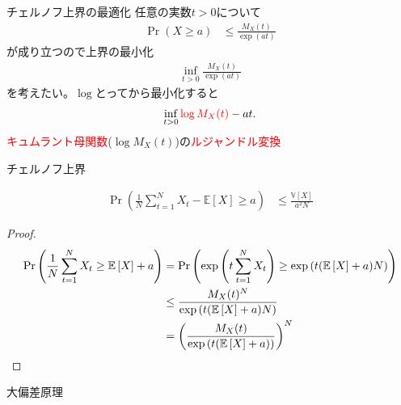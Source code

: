 \documentclass[lualatex,handout]{beamer}
\newcommand{\emm}[1]{\textcolor{red}{#1}}
\newcommand{\expt}[1]{\mathbb{E}\left[#1\right]}
\newcommand{\var}[1]{\mathbb{V}\left[#1\right]}
\theoremstyle{definition}
\begin{document}
\begin{frame}{チェルノフ上界の最適化}
任意の実数$t>0$について
\begin{align*}
\Pr(X\ge a)&\le\frac{M_X(t)}{\exp(at)}
\end{align*}
が成り立つので上界の最小化
\begin{align*}
\inf_{t>0} \frac{M_X(t)}{\exp(at)}
\end{align*}
を考えたい。$\log$とってから最小化すると
\begin{align*}
\inf_{t>0} \emm{\log M_X(t)} - at.
\end{align*}
\emm{キュムラント母関数}($\log M_X(t)$)の\emm{ルジャンドル変換}
\end{frame}

\begin{frame}{チェルノフ上界}
\begin{theorem}
\begin{align*}
\Pr\left(\frac1N\sum_{t=1}^N X_t-\expt{X}\ge a\right) &\le \frac{\var{X}}{a^2N}
\end{align*}
\end{theorem}
\begin{proof}
\small
\begin{align*}
\Pr\left(\frac1N\sum_{t=1}^N X_t\ge \expt{X}+ a\right) &=
\Pr\left(\exp\left(t\sum_{t=1}^N X_t\right)\ge \exp\left(t(\expt{X} + a)N\right)\right)\\
&\le\frac{M_X(t)^N}{\exp\left(t(\expt{X}+ a)N\right)}\\
&=\left(\frac{M_X(t)}{\exp\left(t(\expt{X}+ a)\right)}\right)^N\qedhere
\end{align*}
\end{proof}
\end{frame}

\begin{frame}{大偏差原理}
\end{frame}
\end{document}
